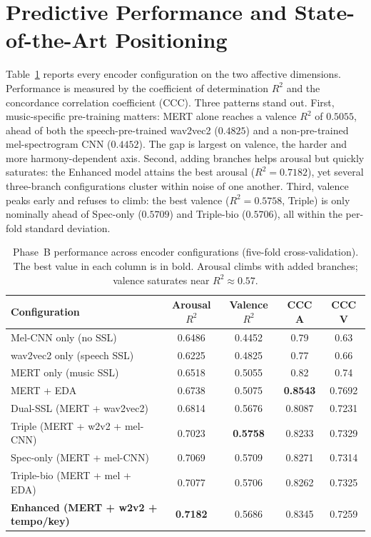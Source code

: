 \documentclass[12pt]{report}
\begin{document}
\section{Predictive Performance and State-of-the-Art Positioning}
\label{sec:results-phaseB}

Table~\ref{tab:phaseB} reports every encoder configuration on the two affective dimensions. Performance is measured by the coefficient of determination $R^{2}$ and the concordance correlation coefficient (CCC). Three patterns stand out. First, music-specific pre-training matters: MERT alone reaches a valence $R^{2}$ of $0.5055$, ahead of both the speech-pre-trained wav2vec2 ($0.4825$) and a non-pre-trained mel-spectrogram CNN ($0.4452$). The gap is largest on valence, the harder and more harmony-dependent axis. Second, adding branches helps arousal but quickly saturates: the Enhanced model attains the best arousal ($R^{2}=0.7182$), yet several three-branch configurations cluster within noise of one another. Third, valence peaks early and refuses to climb: the best valence ($R^{2}=0.5758$, Triple) is only nominally ahead of Spec-only ($0.5709$) and Triple-bio ($0.5706$), all within the per-fold standard deviation.

\begin{table}[t]
\centering
\small
\begin{tabular}{lcccc}
\toprule
\textbf{Configuration} & \textbf{Arousal $R^{2}$} & \textbf{Valence $R^{2}$} & \textbf{CCC A} & \textbf{CCC V} \\
\midrule
Mel-CNN only (no SSL)            & 0.6486 & 0.4452 & 0.79 & 0.63 \\
wav2vec2 only (speech SSL)       & 0.6225 & 0.4825 & 0.77 & 0.66 \\
MERT only (music SSL)            & 0.6518 & 0.5055 & 0.82 & 0.74 \\
MERT + EDA                       & 0.6738 & 0.5075 & \textbf{0.8543} & 0.7692 \\
Dual-SSL (MERT + wav2vec2)       & 0.6814 & 0.5676 & 0.8087 & 0.7231 \\
Triple (MERT + w2v2 + mel-CNN)   & 0.7023 & \textbf{0.5758} & 0.8233 & 0.7329 \\
Spec-only (MERT + mel-CNN)       & 0.7069 & 0.5709 & 0.8271 & 0.7314 \\
Triple-bio (MERT + mel + EDA)    & 0.7077 & 0.5706 & 0.8262 & 0.7325 \\
\textbf{Enhanced (MERT + w2v2 + tempo/key)} & \textbf{0.7182} & 0.5686 & 0.8345 & 0.7259 \\
\bottomrule
\end{tabular}
\caption{Phase~B performance across encoder configurations (five-fold cross-validation). The best value in each column is in bold. Arousal climbs with added branches; valence saturates near $R^{2}\approx0.57$.}
\label{tab:phaseB}
\end{table}
\end{document}
